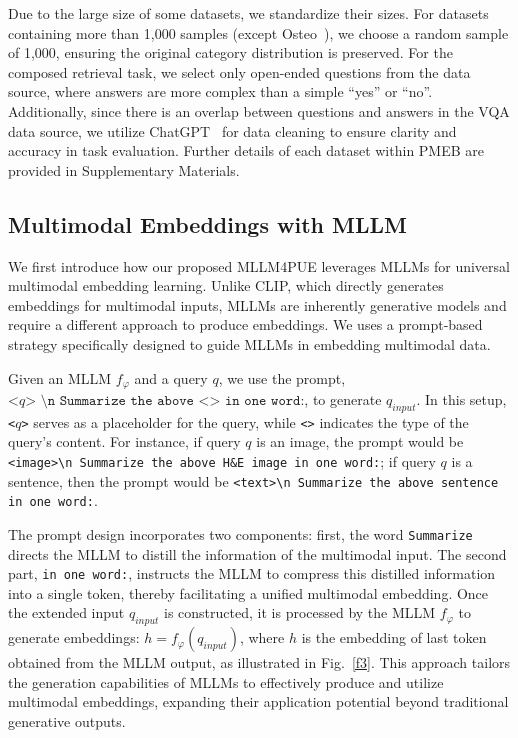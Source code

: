 Due to the large size of some datasets, we standardize their sizes. For datasets containing more than 1,000 samples (except Osteo~\cite{arunachalam2019viable}), we choose a random sample of 1,000, ensuring the original category distribution is preserved. For the composed retrieval task, we select only open-ended questions from the data source, where answers are more complex than a simple ``yes'' or ``no''. Additionally, since there is an overlap between questions and answers in the VQA data source, we utilize ChatGPT~\cite{achiam2023gpt} for data cleaning to ensure clarity and accuracy in task evaluation. Further details of each dataset within PMEB are provided in Supplementary Materials.

\subsection{Multimodal Embeddings with MLLM}\label{2.2}
We first introduce how our proposed MLLM4PUE leverages MLLMs for universal multimodal embedding learning.
Unlike CLIP, which directly generates embeddings for multimodal inputs, MLLMs are inherently generative models and require a different approach to produce embeddings. We uses a prompt-based strategy specifically designed to guide MLLMs in embedding multimodal data.

Given an MLLM $f_{\varphi}$ and a query $q$, we use the prompt, $\texttt{<$q$> \textbackslash n Summarize the above <> in one word:}$, to generate $q_{input}$. In this setup, \texttt{<$q$>} serves as a placeholder for the query, while \texttt{<>} indicates the type of the query's content. For instance, if query $q$ is an image, the prompt would be \texttt{<image>\textbackslash n Summarize the above H\&E image in one word:}; if query $q$ is a sentence, then the prompt would be \texttt{<text>\textbackslash n Summarize the above sentence in one word:}. 

The prompt design incorporates two components: first, the word \texttt{Summarize} directs the MLLM to distill the information of the multimodal input. The second part, \texttt{in one word:}, instructs the MLLM to compress this distilled information into a single token, thereby facilitating a unified multimodal embedding. Once the extended input $q_{input}$ is constructed, it is processed by the MLLM $f_{\varphi}$ to generate embeddings: $h = f_{\varphi}(q_{input})$, where $h$ is the embedding of last token obtained from the MLLM output, as illustrated in Fig.~\ref{f3}. This approach tailors the generation capabilities of MLLMs to effectively produce and utilize multimodal embeddings, expanding their application potential beyond traditional generative outputs.

